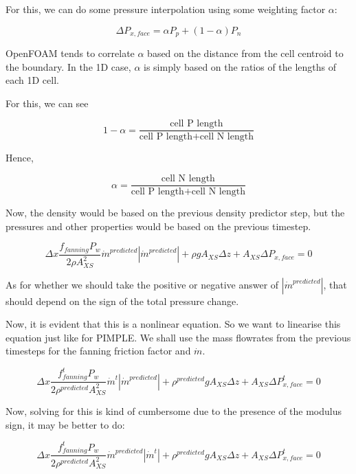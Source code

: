 \documentclass[masters]{ucbthesis}
\renewcommand{\_}{\kern-1.5pt\textunderscore\kern-1.5pt}
\begin{document}
For this, we can do some pressure interpolation using some weighting 
factor $\alpha$:

$$\Delta P_{x,face} = \alpha P_p + (1-\alpha) P_n $$

OpenFOAM tends to correlate $\alpha$ based on the distance from the cell 
centroid to the boundary. In the 1D case, $\alpha$ is simply based on 
the ratios of the lengths of each 1D cell.

For this, we can see 


$$ 1 - \alpha = \frac{\text{cell P length}}{
	\text{cell P length} + \text{cell N length}
} $$

Hence, 


$$ \alpha = \frac{\text{cell N length}}{
	\text{cell P length} + \text{cell N length}
} $$

Now, the density would be based on the previous density predictor step, 
but the pressures and other properties would be based on the previous 
timestep.


\begin{equation*} 
	\Delta x \frac{f_{fanning} P_w}{2 \rho A_{XS}^2} 
	\dot{m}^{predicted} |\dot{m}^{predicted}|
	+\rho g A_{XS} \Delta z
	+ A_{XS} \Delta P_{x,face} = 0
\end{equation*}

As for whether we should take the positive or negative answer of 
$|\dot{m}^{predicted}|$, that should depend on the sign of the total 
pressure change.

Now, it is evident that this is a nonlinear equation. So we want to 
linearise this equation just like for PIMPLE. We shall use the mass 
flowrates from the previous timesteps for the fanning friction factor 
and $\dot{m}$.

\begin{equation*} 
	\Delta x \frac{f_{fanning}^t P_w}{2 \rho^{predicted} A_{XS}^2} 
	\dot{m}^{t} |\dot{m}^{predicted}|
	+\rho^{predicted} g A_{XS} \Delta z
	+ A_{XS} \Delta P_{x,face}^t = 0
\end{equation*}

Now, solving for this is kind of cumbersome due to the presence of 
the modulus sign, it may be better to do:

\begin{equation*} 
	\Delta x \frac{f_{fanning}^t P_w}{2 \rho^{predicted} A_{XS}^2} 
	\dot{m}^{predicted} |\dot{m}^{t}|
	+\rho^{predicted} g A_{XS} \Delta z
	+ A_{XS} \Delta P_{x,face}^t = 0
\end{equation*}
\end{document}
